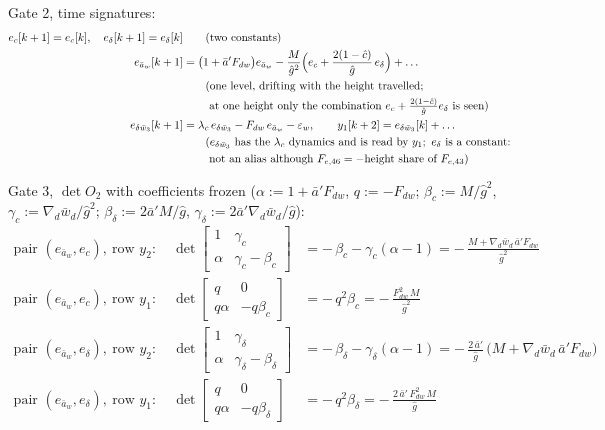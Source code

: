 \documentclass[11pt,a4paper,fontset=none]{ctexart}
\newcommand{\ba}{\bar{a}}
\newcommand{\bw}{\bar{w}}
\newcommand{\ap}{\ba'}
\newcommand{\ch}{\hat{c}}
\newcommand{\dl}{\delta}
\newcommand{\gh}{\hat{g}}
\begin{document}
Gate 2, time signatures:
\begin{align*}
e_c[k+1] = e_c[k], \quad e_{\dl}[k+1] = e_{\dl}[k] &\qquad(\text{two constants}) \\
e_{\ba_w}[k+1] &= \bigl(1 + \ap F_{dw}\bigr)e_{\ba_w} - \frac{M}{\gh^{2}}\Bigl(e_c + \frac{2(1-\ch)}{\gh}\,e_{\dl}\Bigr) + \dots \\
               &\qquad(\text{one level, drifting with the height travelled;} \\
               &\qquad\ \text{at one height only the combination } e_c + \tfrac{2(1-\ch)}{\gh}e_{\dl} \text{ is seen}) \\
e_{\delta\bw_3}[k+1] &= \lambda_c\,e_{\delta\bw_3} - F_{dw}\,e_{\ba_w} - \varepsilon_w, \qquad y_1[k+2] = e_{\delta\bw_3}[k] + \dots \\
               &\qquad(e_{\delta\bw_3} \text{ has the } \lambda_c \text{ dynamics and is read by } y_1;\ e_{\dl} \text{ is a constant:} \\
               &\qquad\ \text{not an alias although } F_{e,46} = -\text{height share of } F_{e,43})
\end{align*}

Gate 3, $\det O_2$ with coefficients frozen ($\alpha := 1 + \ap F_{dw}$, $q := -F_{dw}$;
$\beta_c := M/\gh^{2}$, $\gamma_c := \nabla_d\bw_d/\gh^{2}$; $\beta_{\dl} := 2\ap M/\gh$, $\gamma_{\dl} := 2\ap\nabla_d\bw_d/\gh$):
\begin{align*}
\text{pair } (e_{\ba_w}, e_c),\ \text{row } y_2:\quad
\det\begin{bmatrix} 1 & \gamma_c \\ \alpha & \gamma_c - \beta_c \end{bmatrix} &= -\,\beta_c - \gamma_c(\alpha - 1) = -\,\frac{M + \nabla_d\bw_d\,\ap F_{dw}}{\gh^{2}} \\
\text{pair } (e_{\ba_w}, e_c),\ \text{row } y_1:\quad
\det\begin{bmatrix} q & 0 \\ q\alpha & -q\beta_c \end{bmatrix} &= -\,q^{2}\beta_c = -\,\frac{F_{dw}^{2}\,M}{\gh^{2}} \\[4pt]
\text{pair } (e_{\ba_w}, e_{\dl}),\ \text{row } y_2:\quad
\det\begin{bmatrix} 1 & \gamma_{\dl} \\ \alpha & \gamma_{\dl} - \beta_{\dl} \end{bmatrix} &= -\,\beta_{\dl} - \gamma_{\dl}(\alpha - 1) = -\,\frac{2\,\ap}{\gh}\,\bigl(M + \nabla_d\bw_d\,\ap F_{dw}\bigr) \\
\text{pair } (e_{\ba_w}, e_{\dl}),\ \text{row } y_1:\quad
\det\begin{bmatrix} q & 0 \\ q\alpha & -q\beta_{\dl} \end{bmatrix} &= -\,q^{2}\beta_{\dl} = -\,\frac{2\,\ap\,F_{dw}^{2}\,M}{\gh}
\end{align*}
\end{document}
